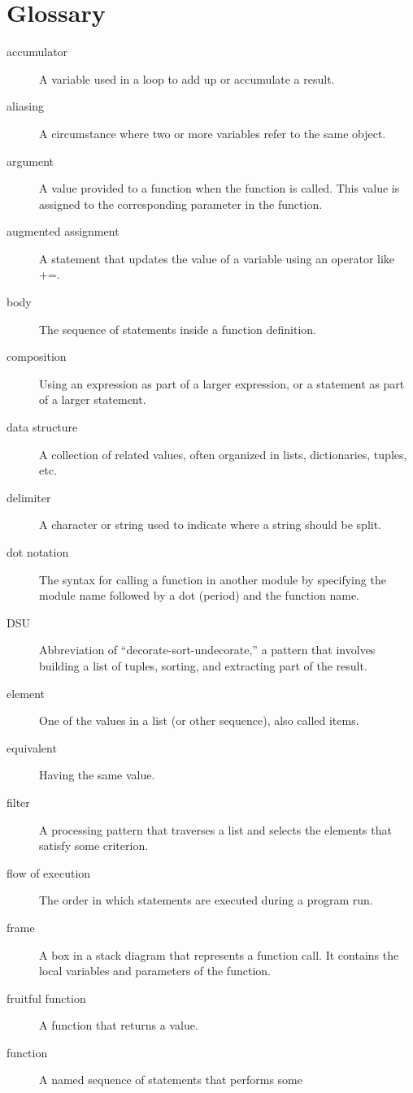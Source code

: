 \documentclass{article}
\begin{document}
\section*{Glossary}
\begin{description}
\item [accumulator] A variable used in a loop to add up or accumulate a result.
\item [aliasing] A circumstance where two or more variables refer to the same object.
\item [argument] A value provided to a function when the function is
    called. This value is assigned to the corresponding parameter in
    the function.

\item [augmented assignment] A statement that updates the value of a variable using an operator like +=.
\item [body] The sequence of statements inside a function definition.
\item [composition] Using an expression as part of a larger
    expression, or a statement as part of a larger statement.
\item [data structure] A collection of related values, often organized
    in lists, dictionaries, tuples, etc.
\item [delimiter] A character or string used to indicate where a string should be split.
\item [dot notation] The syntax for calling a function in another
    module by specifying the module name followed by a dot (period)
    and the function name.
\item [DSU] Abbreviation of ``decorate-sort-undecorate,'' a pattern that
    involves building a list of tuples, sorting, and extracting part
    of the result.
\item [element] One of the values in a list (or other sequence), also called items.
\item [equivalent] Having the same value.
\item [filter] A processing pattern that traverses a list and selects the elements that satisfy some criterion.
\item [flow of execution] The order in which statements are executed
    during a program run.
\item [frame] A box in a stack diagram that represents a function
    call. It contains the local variables and parameters of the
    function.
\item [fruitful function] A function that returns a value.
\item [function] A named sequence of statements that performs some

\end{description}
\end{document}
